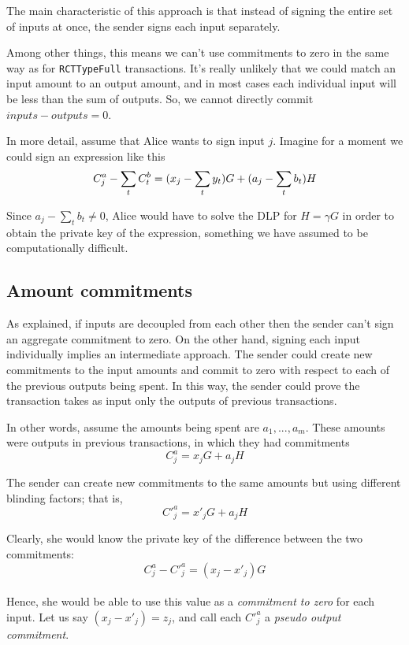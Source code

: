The main characteristic of this approach is that instead of signing the entire set of inputs at once, the sender signs each input separately.

Among other things, this means we can’t use commitments to zero in the same way as for {\tt RCTTypeFull} transactions. It's really unlikely that we could match an input amount to an output amount, and in most cases each individual input will be less than the sum of outputs. So, we cannot directly commit $inputs - outputs = 0$.

In more detail, assume that Alice wants to sign input $j$. Imagine for a moment we could sign an expression like this\vspace{.2cm}
\[  C^a_{j} - \sum\limits_t C^b_{t} \\
= (x_j -  \sum_t y_t) G + (a_j - \sum\limits_t  b_t) H \]

Since \(a_j - \sum\limits_t  b_t \ne 0\), Alice would have to solve the DLP for \(H = \gamma G\) in order to obtain the private key of the expression, something we have assumed to be computationally difficult.


\subsection{Amount commitments}
\label{RCTTypeSimple-commitments}

As explained, if inputs are decoupled from each other then the sender can't sign an aggregate commitment to zero. On the other hand, signing each input individually implies an intermediate approach. The sender could create new commitments to the input amounts and commit to zero with respect to each of the previous outputs being spent. In this way, the sender could prove the transaction takes as input only the outputs of previous transactions.

In other words, assume the amounts being spent are \(a_1, ..., a_m\). These amounts were outputs in previous transactions, in which they had commitments\vspace{.2cm}
\[C^a_{j} = x_j G + a_j H\]


The sender can create new commitments to the same amounts but using different blinding factors; that is,
\[C'^a_{j} = x'_j G + a_j H\]

Clearly, she would know the private key of the difference between the two commitments: \vspace{.3cm}
\[ C^a_{j} - C'^a_{j} = (x_j - x'_j) G \] \\
Hence, she would be able to use this value as a {\em commitment to zero} for each input. Let us say $(x_j - x'_j) = z_j$, and call each $C'^a_j$ a {\em pseudo output commitment}.
\\

